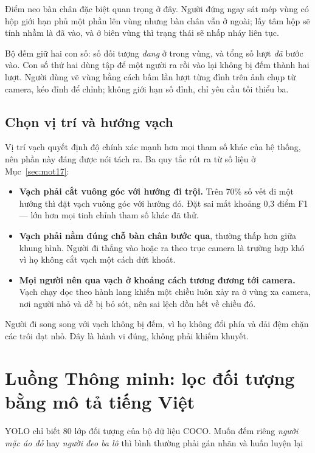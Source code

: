 Điểm neo bàn chân đặc biệt quan trọng ở đây. Người đứng ngay sát mép vùng có hộp giới
hạn phủ một phần lên vùng nhưng bàn chân vẫn ở ngoài; lấy tâm hộp sẽ tính nhầm là đã
vào, và ở biên vùng thì trạng thái sẽ nhấp nháy liên tục.

Bộ đếm giữ hai con số: số đối tượng \emph{đang} ở trong vùng, và tổng số lượt \emph{đã}
bước vào. Con số thứ hai dùng tập  để một người ra rồi vào lại không bị
đếm thành hai lượt. Người dùng vẽ vùng bằng cách bấm lần lượt từng đỉnh trên ảnh chụp
từ camera, kéo đỉnh để chỉnh; không giới hạn số đỉnh, chỉ yêu cầu tối thiểu ba.

\subsection{Chọn vị trí và hướng vạch}
\label{sub:datvach}

Vị trí vạch quyết định độ chính xác mạnh hơn mọi tham số khác của hệ thống, nên phần
này đáng được nói tách ra. Ba quy tắc rút ra từ số liệu ở Mục~\ref{sec:mot17}:

\begin{itemize}[leftmargin=*, itemsep=2pt]
  \item \textbf{Vạch phải cắt vuông góc với hướng đi trội.} Trên 70\% số vết đi một
        hướng thì đặt vạch vuông góc với hướng đó. Đặt sai mất khoảng 0{,}3 điểm F1 ---
        lớn hơn mọi tinh chỉnh tham số khác đã thử.
  \item \textbf{Vạch phải nằm đúng chỗ bàn chân bước qua}, thường thấp hơn giữa khung
        hình. Người đi thẳng vào hoặc ra theo trục camera là trường hợp khó vì họ không
        cắt vạch một cách dứt khoát.
  \item \textbf{Mọi người nên qua vạch ở khoảng cách tương đương tới camera.} Vạch chạy
        dọc theo hành lang khiến một chiều luôn xảy ra ở vùng xa camera, nơi người nhỏ
        và dễ bị bỏ sót, nên sai lệch dồn hết về chiều đó.
\end{itemize}

Người đi song song với vạch không bị đếm, vì họ không đổi phía và dải đệm chặn các trôi
dạt nhỏ. Đây là hành vi đúng, không phải khiếm khuyết.

\section{Luồng Thông minh: lọc đối tượng bằng mô tả tiếng Việt}
\label{sec:thongminh}

YOLO chỉ biết 80 lớp đối tượng của bộ dữ liệu COCO. Muốn đếm riêng \emph{người mặc áo
đỏ} hay \emph{người đeo ba lô} thì bình thường phải gán nhãn và huấn luyện lại 

